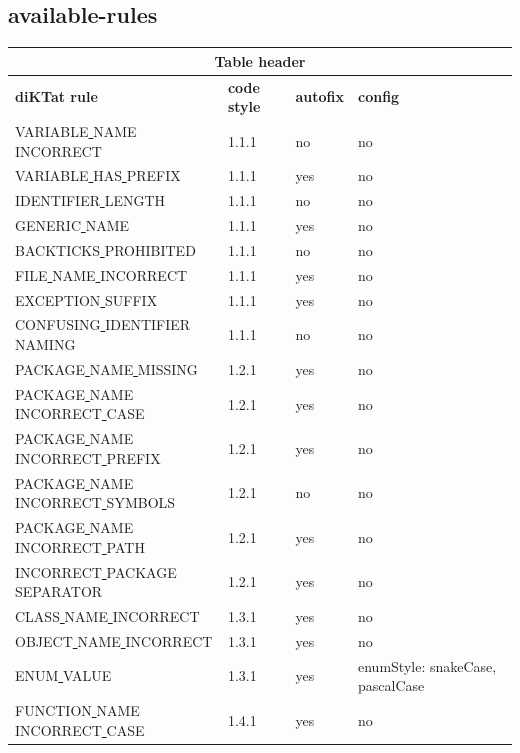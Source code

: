 \subsection{available-rules}
\begin{center}
\scriptsize
\begin{longtable}{ |l|p{0.8cm}|p{0.8cm}| p{3cm} | }
\hline
\multicolumn{4}{|c|}{Table header} \\ 
\hline
\textbf{diKTat rule} & \textbf{code style} & \textbf{autofix} &  \textbf{config} \\
\hline
VARIABLE\underline{ }NAME\underline{ }INCORRECT & 1.1.1 &  no  &  no \\
VARIABLE\underline{ }HAS\underline{ }PREFIX & 1.1.1 &  yes  &  no \\
IDENTIFIER\underline{ }LENGTH & 1.1.1 &  no  &  no \\
GENERIC\underline{ }NAME & 1.1.1 &  yes  &  no \\
BACKTICKS\underline{ }PROHIBITED & 1.1.1 &  no  &  no \\
FILE\underline{ }NAME\underline{ }INCORRECT & 1.1.1 &  yes  &  no \\
EXCEPTION\underline{ }SUFFIX & 1.1.1 &  yes  &  no \\
CONFUSING\underline{ }IDENTIFIER\underline{ }NAMING & 1.1.1 &  no  &  no \\
PACKAGE\underline{ }NAME\underline{ }MISSING & 1.2.1 &  yes  &  no \\
PACKAGE\underline{ }NAME\underline{ }INCORRECT\underline{ }CASE & 1.2.1 &  yes  &  no \\
PACKAGE\underline{ }NAME\underline{ }INCORRECT\underline{ }PREFIX & 1.2.1 &  yes  &  no \\
PACKAGE\underline{ }NAME\underline{ }INCORRECT\underline{ }SYMBOLS & 1.2.1 &  no  &  no \\
PACKAGE\underline{ }NAME\underline{ }INCORRECT\underline{ }PATH & 1.2.1 &  yes  &  no \\
INCORRECT\underline{ }PACKAGE\underline{ }SEPARATOR & 1.2.1 &  yes  &  no \\
CLASS\underline{ }NAME\underline{ }INCORRECT & 1.3.1 &  yes  &  no \\
OBJECT\underline{ }NAME\underline{ }INCORRECT & 1.3.1 &  yes  &  no \\
ENUM\underline{ }VALUE & 1.3.1 &  yes  &  enumStyle: snakeCase, pascalCase \\
FUNCTION\underline{ }NAME\underline{ }INCORRECT\underline{ }CASE & 1.4.1 &  yes  &  no \\

\end{longtable}
\end{center}
